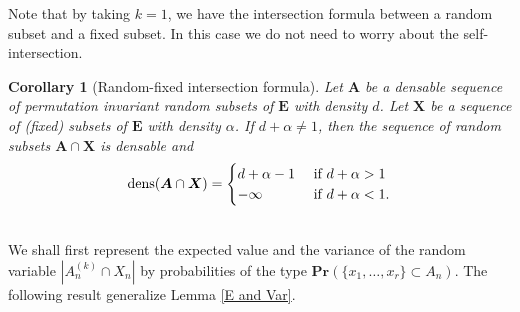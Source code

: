 \documentclass{article}
\DeclareMathOperator{\dens}{dens}
\newcommand{\bs}{\boldsymbol}
\def\Pr{\mathbf{Pr}}
\newtheorem{cor}[thm]{Corollary}
\theoremstyle{remark}
\begin{document}
Note that by taking $k=1$, we have the intersection formula between a random subset and a fixed subset. In this case we do not need to worry about the self-intersection.

\begin{cor}[Random-fixed intersection formula] \label{random-fixed intersection} Let $\bs A$ be a densable sequence of permutation invariant random subsets of $\bs E$ with density $d$. Let $\bs X$ be a sequence of (fixed) subsets of $\bs E$ with density $\alpha$. If $d + \alpha \neq 1$, then the sequence of random subsets $\bs A\cap \bs X$ is densable and 
    \[\dens (\bs A\cap \bs X) = \begin{cases}
        d + \alpha - 1 & \textup{ if } d + \alpha > 1\\
        -\infty & \textup{ if } d + \alpha < 1.
        \end{cases}\]
\end{cor}\quad\\

We shall first represent the expected value and the variance of the random variable $|A_n^{(k)}\cap X_n|$ by probabilities of the type $\Pr\left(\{x_1,\dots,x_r\} \subset A_n\right)$. The following result generalize Lemma \ref{E and Var}.
\end{document}

